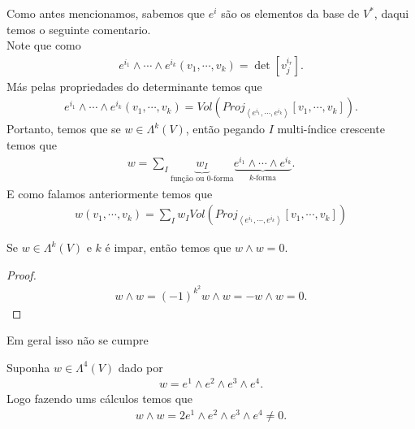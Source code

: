 \begin{note}
  Como antes mencionamos, sabemos que $e^{i}$ são os elementos da base de $V^{\ast}$, daqui temos o seguinte comentario.\\
  Note que como
  \begin{align*}
    e^{i_1}\wedge\cdots\wedge e^{i_k}(v_1,\cdots,v_k)=\det\left[ v^{i_r}_{j} \right].  
  \end{align*}
  Más pelas propriedades do determinante temos que
  \begin{align*} 
    e^{i_1}\wedge\cdots\wedge e^{i_k}(v_1,\cdots,v_k)=Vol(Proj_{\left\langle e^{i_1},\cdots,e^{i_k} \right\rangle}\left[ v_1,\cdots,v_k \right]).  
  \end{align*}
  Portanto, temos que se $w\in\Lambda^{k}(V)$, então pegando $I$ multi-índice crescente temos que 
  \begin{align*}
    w=\sum_{I}\underbrace{w_I}_{\text{função ou $0$-forma}}\underbrace{e^{i_1}\wedge\cdots\wedge e^{i_k}}_{\text{$k$-forma}}.
  \end{align*}
  E como falamos anteriormente temos que
  \begin{align*}
    w(v_1,\cdots,v_k)=\sum_{I}w_I Vol(Proj_{\left\langle e^{i_1},\cdots,e^{i_k} \right\rangle}\left[ v_1,\cdots,v_k \right])
  \end{align*}
\end{note}
\begin{proposition}
  Se $w\in\Lambda^{k}(V)$ e $k$ é impar, então temos que $w\wedge w=0$. 
\end{proposition}
\begin{proof} 
  \begin{align*}
    w\wedge w=(-1)^{k^{2}}w\wedge w=-w\wedge w=0.
  \end{align*}
\end{proof}
Em geral isso não se cumpre
\begin{example}
  Suponha $w\in\Lambda^{4}(V)$ dado por 
  \begin{align*}
    w=e^{1}\wedge e^{2}\wedge e^{3}\wedge e^{4}.
  \end{align*}
  Logo fazendo ums cálculos temos que
  \begin{align*}
    w\wedge w=2e^{1}\wedge e^{2}\wedge e^{3}\wedge e^{4}\neq 0. 
  \end{align*}
\end{example}
